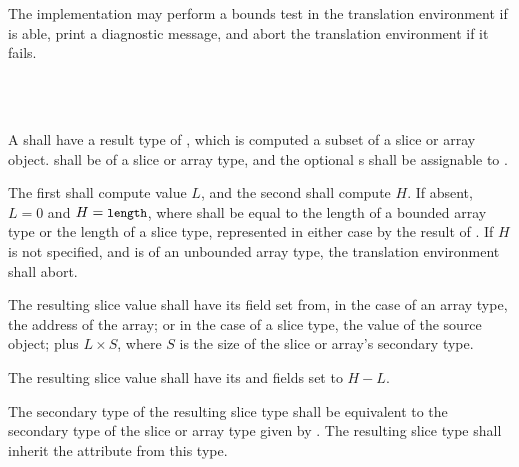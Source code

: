 The implementation may perform a bounds test in the translation environment if
is able, print a diagnostic message, and abort the translation environment if
it fails.


\begin{grammar}
 \\
	 \terminal{[}    \terminal{]} \\
\end{grammar}

\specsubsubitem
A  shall have a result type of
, which is computed a subset of a slice or array object.
 shall be of a slice or array type, and the
optional s shall be assignable to
.

\specsubsubitem
The first  shall compute value $L$, and the
second shall compute $H$. If absent, $L = 0$ and $H = \mbox{\textup{\small\texttt{length}}}$, where
 shall be equal to the length of a bounded array type or the
length of a slice type, represented in either case by the result of
. If $H$ is not specified, and
 is of an unbounded array type, the translation
environment shall abort.

\specsubsubitem
The resulting slice value shall have its  field set from, in the case
of an array type, the address of the array; or in the case of a slice type, the
 value of the source object; plus $L \times S$, where $S$ is the
size of the slice or array's secondary type.

\specsubsubitem
The resulting slice value shall have its  and 
fields set to $H - L$.

\specsubsubitem
The secondary type of the resulting slice type shall be equivalent to the
secondary type of the slice or array type given by
. The resulting slice type shall inherit the
 attribute from this type.


